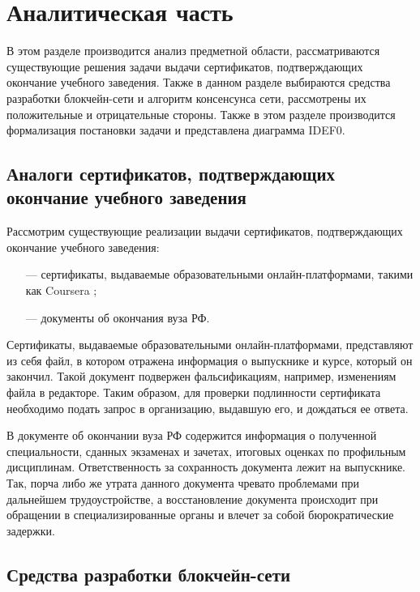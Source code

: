 \section{Аналитическая часть}

В этом разделе производится анализ предметной области, рассматриваются существующие решения задачи выдачи сертификатов, подтверждающих окончание учебного заведения. Также в данном разделе выбираются средства разработки блокчейн-сети и алгоритм консенсунса сети, рассмотрены их положительные и отрицательные стороны. Также в этом разделе производится формализация постановки задачи и представлена диаграмма IDEF0.

\subsection{Аналоги сертификатов, подтверждающих окончание учебного заведения}

Рассмотрим существующие реализации выдачи сертификатов, подтверждающих окончание учебного заведения:
\begin{itemize}[leftmargin=1.6\parindent]
	\item[---] сертификаты, выдаваемые образовательными онлайн-платформами, такими как Coursera \cite{coursera};
	\item[---] документы об окончания вуза РФ.
\end{itemize}

Сертификаты, выдаваемые образовательными онлайн-платформами, представляют из себя файл, в котором отражена информация о выпускнике и курсе, который он закончил. Такой документ подвержен фальсификациям, например, изменениям файла в редакторе. Таким образом, для проверки подлинности сертификата необходимо подать запрос в организацию, выдавшую его, и дождаться ее ответа.


В документе об окончании вуза РФ содержится информация о полученной специальности, сданных экзаменах и зачетах, итоговых оценках по профильным дисциплинам. Ответственность за сохранность документа лежит на выпускнике. Так, порча либо же утрата данного документа чревато проблемами при дальнейшем трудоустройстве, а восстановление документа происходит при обращении в специализированные органы и влечет за собой бюрократические задержки.





\subsection{Средства разработки блокчейн-сети}

